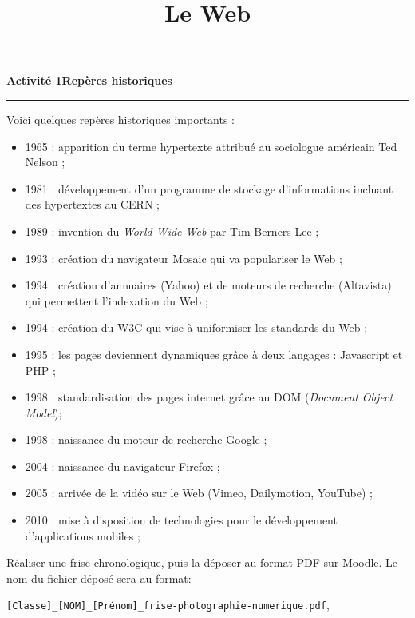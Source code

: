 \documentclass[a4paper]{article}
\begin{document}
\title{Le Web}

\pagestyle{empty}

\date{}
\author{}

\maketitle{}

\thispagestyle{empty}
\noindent\textbf{Activité 1}\hfill{}\textbf{Repères historiques}
\smallskip
\hrule
\medskip

Voici quelques repères historiques importants :

\begin{itemize}
  \item 1965 : apparition du terme \og{}hypertexte\fg{} attribué au sociologue américain Ted Nelson ;
  \item 1981 : développement d'un programme de stockage d'informations incluant des hypertextes au CERN ;
  \item 1989 : invention du \textit{World Wide Web} par Tim Berners-Lee ;
  \item 1993 : création du navigateur Mosaic qui va populariser le Web ;
  \item 1994 : création d'annuaires (Yahoo) et de moteurs de recherche (Altavista) qui permettent l'indexation du Web ;
  \item 1994 : création du W3C qui vise à uniformiser les standards du Web ;
  \item 1995 : les pages deviennent dynamiques grâce à deux langages : Javascript et PHP ;
  \item 1998 : standardisation des pages internet grâce au DOM (\textit{Document Object Model});
  \item 1998 : naissance du moteur de recherche Google ;
  \item 2004 : naissance du navigateur Firefox ;
  \item 2005 : arrivée de la vidéo sur le Web (Vimeo, Dailymotion, YouTube) ;
  \item 2010 : mise à disposition de technologies pour le développement d'applications mobiles ;
\end{itemize}

Réaliser une frise chronologique, puis la déposer au format PDF sur Moodle. Le nom du fichier déposé sera au format: 

\begin{center}
  \verb|[Classe]_[NOM]_[Prénom]_frise-photographie-numerique.pdf|,
\end{center} 
\end{document}
